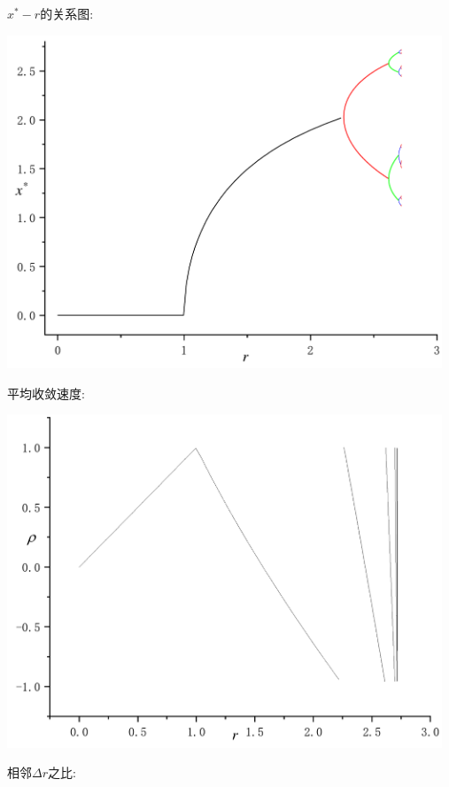 \documentclass[UTF8]{ctexart}
\begin{document}
        \indent $x^*-r$的关系图:
        \begin{center}
            \includegraphics[width=13cm]{q9/t1-16.pdf}
        \end{center}
        \indent 平均收敛速度:
        \begin{center}
            \includegraphics[width=13cm]{q9/rho.pdf}
        \end{center}
        \indent 相邻$\Delta r$之比:
\end{document}
